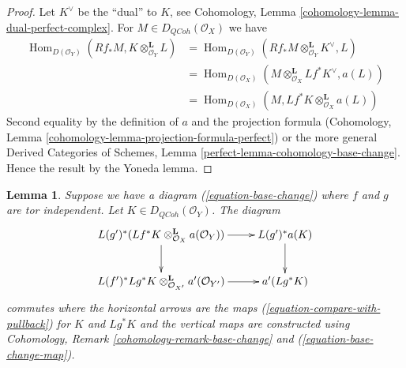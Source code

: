 \documentclass{stacks-project}
\theoremstyle{plain}
\newtheorem{lemma}[subsection]{Lemma}
\theoremstyle{definition}
\theoremstyle{remark}
\numberwithin{equation}{subsection}
\def\Hom{\mathop{\mathrm{Hom}}\nolimits}
\def\QCoh{\mathit{QCoh}}
\begin{document}
\begin{proof}
Let $K^\vee$ be the ``dual'' to $K$, see
Cohomology, Lemma \ref{cohomology-lemma-dual-perfect-complex}.
For $M \in D_\QCoh(\mathcal{O}_X)$ we have
\begin{align*}
\Hom_{D(\mathcal{O}_Y)}(Rf_*M, K \otimes^\mathbf{L}_{\mathcal{O}_Y} L)
& =
\Hom_{D(\mathcal{O}_Y)}(
Rf_*M \otimes^\mathbf{L}_{\mathcal{O}_Y} K^\vee, L) \\
& =
\Hom_{D(\mathcal{O}_X)}(
M \otimes^\mathbf{L}_{\mathcal{O}_X} Lf^*K^\vee, a(L)) \\
& =
\Hom_{D(\mathcal{O}_X)}(M,
Lf^*K \otimes^\mathbf{L}_{\mathcal{O}_X} a(L))
\end{align*}
Second equality by the definition of $a$ and the projection formula
(Cohomology, Lemma \ref{cohomology-lemma-projection-formula-perfect})
or the more general Derived Categories of Schemes, Lemma
\ref{perfect-lemma-cohomology-base-change}.
Hence the result by the Yoneda lemma.
\end{proof}

\begin{lemma}
\label{lemma-restriction-compare-with-pullback}
Suppose we have a diagram (\ref{equation-base-change}) where $f$ and $g$
are tor independent. Let $K \in D_\QCoh(\mathcal{O}_Y)$. The diagram
$$
\xymatrix{
L(g')^*(Lf^*K \otimes^\mathbf{L}_{\mathcal{O}_X} a(\mathcal{O}_Y))
\ar[r] \ar[d] & L(g')^*a(K) \ar[d] \\
L(f')^*Lg^*K \otimes_{\mathcal{O}_{X'}}^\mathbf{L} a'(\mathcal{O}_{Y'})
\ar[r] & a'(Lg^*K)
}
$$
commutes where the horizontal arrows are the maps
(\ref{equation-compare-with-pullback}) for $K$ and $Lg^*K$
and the vertical maps are constructed using
Cohomology, Remark \ref{cohomology-remark-base-change} and
(\ref{equation-base-change-map}).
\end{lemma}
\end{document}
